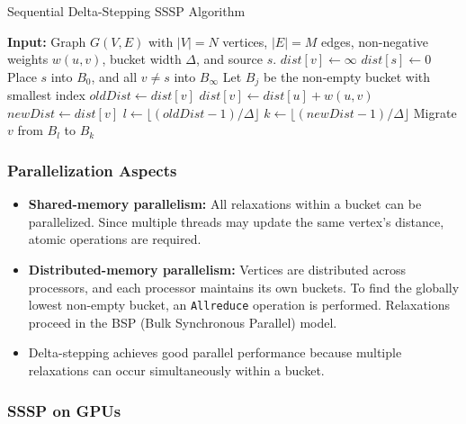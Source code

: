 \documentclass[12pt]{book}
\begin{document}
\begin{algorithm}[H]
\caption{Sequential Delta-Stepping SSSP Algorithm}
\label{alg:Delta}
\begin{algorithmic}[1]
\State \textbf{Input:} Graph $G(V,E)$ with $|V| = N$ vertices, $|E| = M$ edges, non-negative weights $w(u,v)$, bucket width $\Delta$, and source $s$.
    \State $dist[v] \gets \infty$
\EndFor
\State $dist[s] \gets 0$
\State Place $s$ into $B_0$, and all $v \neq s$ into $B_\infty$
    \State Let $B_j$ be the non-empty bucket with smallest index
     
             
                    \State $oldDist \gets dist[v]$
                    \State $dist[v] \gets dist[u] + w(u,v)$
                    \State $newDist \gets dist[v]$
                    \State $l \gets \lfloor (oldDist-1)/\Delta \rfloor$ 
                    \State $k \gets \lfloor (newDist-1)/\Delta \rfloor$ 
                    \State Migrate $v$ from $B_l$ to $B_k$
                \EndIf
            \EndFor
        \EndFor
    \EndWhile
\EndWhile
\end{algorithmic}
\end{algorithm}

\subsubsection*{Parallelization Aspects}
\begin{itemize}
    \item \textbf{Shared-memory parallelism:} All relaxations within a bucket can be parallelized. Since multiple threads may update the same vertex’s distance, atomic operations are required.
    \item \textbf{Distributed-memory parallelism:} Vertices are distributed across processors, and each processor maintains its own buckets. To find the globally lowest non-empty bucket, an \texttt{Allreduce} operation is performed. Relaxations proceed in the BSP (Bulk Synchronous Parallel) model.
    \item Delta-stepping achieves good parallel performance because multiple relaxations can occur simultaneously within a bucket.
\end{itemize}

\subsubsection{SSSP on GPUs}
\end{document}

